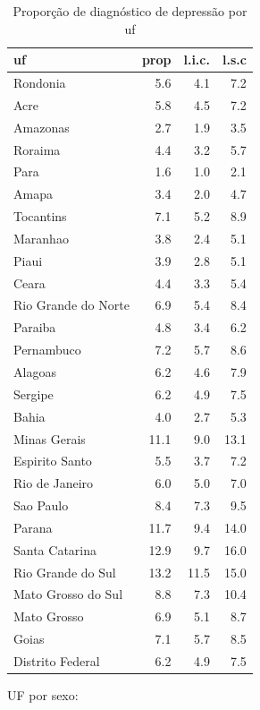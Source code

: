 \documentclass[]{book}
\numberwithin{example}{chapter}
\numberwithin{remark}{chapter}
\numberwithin{definition}{chapter}
\begin{document}
\begin{table}

\caption{\label{tab:unnamed-chunk-45}Proporção de diagnóstico de depressão por uf}
\centering
\begin{tabular}[t]{lrrr}
\toprule
uf & prop & l.i.c. & l.s.c\\
\midrule
Rondonia & 5.6 & 4.1 & 7.2\\
Acre & 5.8 & 4.5 & 7.2\\
Amazonas & 2.7 & 1.9 & 3.5\\
Roraima & 4.4 & 3.2 & 5.7\\
Para & 1.6 & 1.0 & 2.1\\
\addlinespace
Amapa & 3.4 & 2.0 & 4.7\\
Tocantins & 7.1 & 5.2 & 8.9\\
Maranhao & 3.8 & 2.4 & 5.1\\
Piaui & 3.9 & 2.8 & 5.1\\
Ceara & 4.4 & 3.3 & 5.4\\
\addlinespace
Rio Grande do Norte & 6.9 & 5.4 & 8.4\\
Paraiba & 4.8 & 3.4 & 6.2\\
Pernambuco & 7.2 & 5.7 & 8.6\\
Alagoas & 6.2 & 4.6 & 7.9\\
Sergipe & 6.2 & 4.9 & 7.5\\
\addlinespace
Bahia & 4.0 & 2.7 & 5.3\\
Minas Gerais & 11.1 & 9.0 & 13.1\\
Espirito Santo & 5.5 & 3.7 & 7.2\\
Rio de Janeiro & 6.0 & 5.0 & 7.0\\
Sao Paulo & 8.4 & 7.3 & 9.5\\
\addlinespace
Parana & 11.7 & 9.4 & 14.0\\
Santa Catarina & 12.9 & 9.7 & 16.0\\
Rio Grande do Sul & 13.2 & 11.5 & 15.0\\
Mato Grosso do Sul & 8.8 & 7.3 & 10.4\\
Mato Grosso & 6.9 & 5.1 & 8.7\\
\addlinespace
Goias & 7.1 & 5.7 & 8.5\\
Distrito Federal & 6.2 & 4.9 & 7.5\\
\bottomrule
\end{tabular}
\end{table}

UF por sexo:
\end{document}
